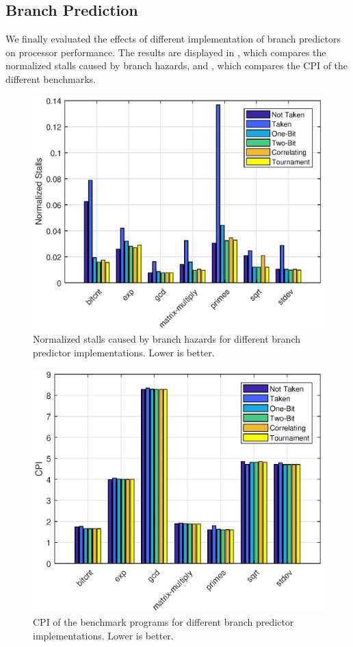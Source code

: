 \documentclass[conference, hidelinks]{IEEEtran}
\begin{document}
\subsection{Branch Prediction}

We finally evaluated the effects of different implementation of branch predictors on processor performance. The results are displayed in , which compares the normalized stalls caused by branch hazards, and , which compares the CPI of the different benchmarks.

\begin{figure}[!htb]
  \centering
  \includegraphics[width=0.775\columnwidth]{plots/bp_stalls.eps}
  \caption{Normalized stalls caused by branch hazards for different branch predictor implementations. Lower is better.}
  \label{fig:bp_stalls}
\end{figure}

\begin{figure}[!htb]
  \centering
  \includegraphics[width=0.775\columnwidth]{plots/bp_cpi.eps}
  \caption{CPI of the benchmark programs for different branch predictor implementations. Lower is better.}
  \label{fig:bp_cpi}
\end{figure}
\end{document}
